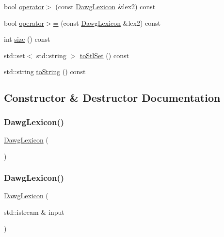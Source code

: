 \begin{DoxyCompactItemize}
\item 
bool \mbox{\hyperlink{classDawgLexicon_ad36b61790c0aa454fddf60d15b52b158}{operator$>$}} (const \mbox{\hyperlink{classDawgLexicon}{Dawg\+Lexicon}} \&lex2) const
\item 
bool \mbox{\hyperlink{classDawgLexicon_af4f0508490235ae1af1b9234ac9fe01d}{operator$>$=}} (const \mbox{\hyperlink{classDawgLexicon}{Dawg\+Lexicon}} \&lex2) const
\item 
int \mbox{\hyperlink{classDawgLexicon_af9593d4a5ff4274efaf429cb4f9e57cc}{size}} () const
\item 
std\+::set$<$ std\+::string $>$ \mbox{\hyperlink{classDawgLexicon_a56b9ca7800c467295cab333fd9815291}{to\+Stl\+Set}} () const
\item 
std\+::string \mbox{\hyperlink{classDawgLexicon_a1fe5121d6528fdea3f243321b3fa3a49}{to\+String}} () const
\end{DoxyCompactItemize}


\subsection{Constructor \& Destructor Documentation}
\mbox{\label{classDawgLexicon_ad974b1304fbda26ca2e7b0775640e826}} 
\subsubsection{\texorpdfstring{Dawg\+Lexicon()}{DawgLexicon()}\hspace{0.1cm}{\footnotesize\ttfamily [1/5]}}
{\footnotesize\ttfamily \mbox{\hyperlink{classDawgLexicon}{Dawg\+Lexicon}} (\begin{DoxyParamCaption}{ }\end{DoxyParamCaption})}

\mbox{\label{classDawgLexicon_ad85bfb9847f7e7e33b68287b6ec800fd}} 
\subsubsection{\texorpdfstring{Dawg\+Lexicon()}{DawgLexicon()}\hspace{0.1cm}{\footnotesize\ttfamily [2/5]}}
{\footnotesize\ttfamily \mbox{\hyperlink{classDawgLexicon}{Dawg\+Lexicon}} (\begin{DoxyParamCaption}\item[{std\+::istream \&}]{input }\end{DoxyParamCaption})}

